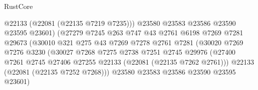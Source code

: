 \begin{lexlean}{RustCore}
\begin{coremodule}
                                          @22133
                                          (@22081 (@22135 @7219 @7235)))
                                        @23580
                                        @23583
                                        @23586
                                        @23590
                                        @23595
                                        @23601)
                                      (@27279
                                        @7245
                                        @263
                                        @747
                                        @43
                                        @2761
                                        @6198
                                        @7269
                                        @7281
                                        @29673
                                        (@30010
                                          @321
                                          @275
                                          @43
                                          @7269
                                          @7278
                                          @2761
                                          @7281
                                          (@30020
                                            @7269
                                            @7276
                                            @3230
                                            (@30027
                                              @7268
                                              @7275
                                              @2738
                                              @7251
                                              @2745
                                              @29976
                                              (@27400
                                                @7261
                                                @2745
                                                @27406
                                                @27255
                                                @22133
                                                (@22081 (@22135 @7262 @2761)))
                                              @22133
                                              (@22081 (@22135 @7252 @7268)))
                                            @23580
                                            @23583
                                            @23586
                                            @23590
                                            @23595
                                            @23601)

\end{coremodule}
\end{lexlean}
